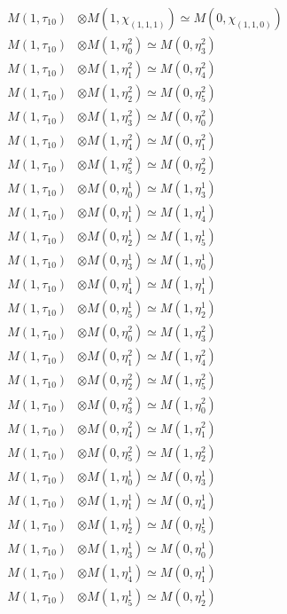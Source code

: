 \begin{align*}
M(1,\tau_{10}) &\otimes M(1,\chi_{(1,1,1)}) \simeq M(0,\chi_{(1,1,0)}) \\
M(1,\tau_{10}) &\otimes M(1,\eta^{2}_{0}) \simeq M(0,\eta^{2}_{3}) \\
M(1,\tau_{10}) &\otimes M(1,\eta^{2}_{1}) \simeq M(0,\eta^{2}_{4}) \\
M(1,\tau_{10}) &\otimes M(1,\eta^{2}_{2}) \simeq M(0,\eta^{2}_{5}) \\
M(1,\tau_{10}) &\otimes M(1,\eta^{2}_{3}) \simeq M(0,\eta^{2}_{0}) \\
M(1,\tau_{10}) &\otimes M(1,\eta^{2}_{4}) \simeq M(0,\eta^{2}_{1}) \\
M(1,\tau_{10}) &\otimes M(1,\eta^{2}_{5}) \simeq M(0,\eta^{2}_{2}) \\
M(1,\tau_{10}) &\otimes M(0,\eta^{1}_{0}) \simeq M(1,\eta^{1}_{3}) \\
M(1,\tau_{10}) &\otimes M(0,\eta^{1}_{1}) \simeq M(1,\eta^{1}_{4}) \\
M(1,\tau_{10}) &\otimes M(0,\eta^{1}_{2}) \simeq M(1,\eta^{1}_{5}) \\
M(1,\tau_{10}) &\otimes M(0,\eta^{1}_{3}) \simeq M(1,\eta^{1}_{0}) \\
M(1,\tau_{10}) &\otimes M(0,\eta^{1}_{4}) \simeq M(1,\eta^{1}_{1}) \\
M(1,\tau_{10}) &\otimes M(0,\eta^{1}_{5}) \simeq M(1,\eta^{1}_{2}) \\
M(1,\tau_{10}) &\otimes M(0,\eta^{2}_{0}) \simeq M(1,\eta^{2}_{3}) \\
M(1,\tau_{10}) &\otimes M(0,\eta^{2}_{1}) \simeq M(1,\eta^{2}_{4}) \\
M(1,\tau_{10}) &\otimes M(0,\eta^{2}_{2}) \simeq M(1,\eta^{2}_{5}) \\
M(1,\tau_{10}) &\otimes M(0,\eta^{2}_{3}) \simeq M(1,\eta^{2}_{0}) \\
M(1,\tau_{10}) &\otimes M(0,\eta^{2}_{4}) \simeq M(1,\eta^{2}_{1}) \\
M(1,\tau_{10}) &\otimes M(0,\eta^{2}_{5}) \simeq M(1,\eta^{2}_{2}) \\
M(1,\tau_{10}) &\otimes M(1,\eta^{1}_{0}) \simeq M(0,\eta^{1}_{3}) \\
M(1,\tau_{10}) &\otimes M(1,\eta^{1}_{1}) \simeq M(0,\eta^{1}_{4}) \\
M(1,\tau_{10}) &\otimes M(1,\eta^{1}_{2}) \simeq M(0,\eta^{1}_{5}) \\
M(1,\tau_{10}) &\otimes M(1,\eta^{1}_{3}) \simeq M(0,\eta^{1}_{0}) \\
M(1,\tau_{10}) &\otimes M(1,\eta^{1}_{4}) \simeq M(0,\eta^{1}_{1}) \\
M(1,\tau_{10}) &\otimes M(1,\eta^{1}_{5}) \simeq M(0,\eta^{1}_{2}) \\
\end{align*}


